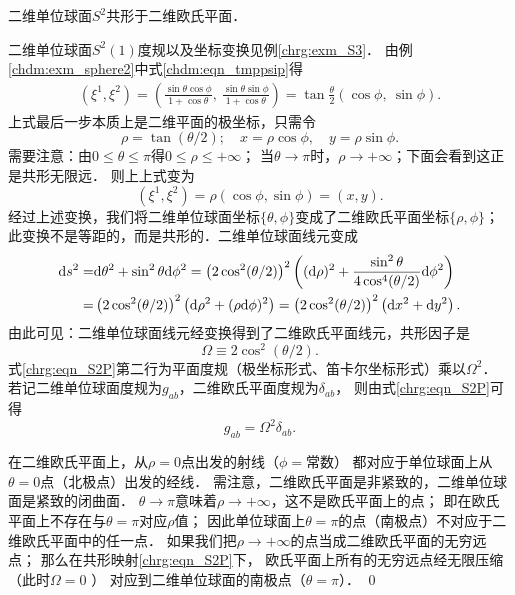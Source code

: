 \begin{example}
	二维单位球面$S^2$共形于二维欧氏平面．
\end{example}
二维单位球面$S^2(1)$度规以及坐标变换见例\ref{chrg:exm_S3}．
由例\ref{chdm:exm_sphere2}中式\eqref{chdm:eqn_tmppsip}得
\begin{align}
	(\xi^1,\xi^2) 
	= \left(\frac{\sin\theta \cos\phi }{1+\cos\theta},\ \frac{\sin\theta \sin\phi}{1+\cos\theta}\right) 
	= \tan \frac{\theta}{2} \left(\cos\phi,\ \sin\phi\right).
\end{align}
上式最后一步本质上是二维平面的极坐标，只需令
\begin{equation}
	\rho=\tan ({\theta}/{2});\quad 
	x = \rho \cos\phi, \quad y = \rho \sin\phi .
\end{equation}
需要注意：由$0 \leqslant \theta \leqslant \pi$得$0\leqslant \rho \leqslant +\infty$；
当$\theta\to \pi$时，$\rho\to +\infty$；下面会看到这正是共形无限远．
则上上式变为
\begin{equation}
	(\xi^1,\xi^2)=\rho\left(\cos\phi,\sin\phi\right) = (x,y).
\end{equation}
经过上述变换，我们将二维单位球面坐标$\{\theta,\phi\}$变成了二维欧氏平面坐标$\{\rho,\phi\}$；
此变换不是等距的，而是共形的．二维单位球面线元变成
\begin{align}
	\mathrm{d} {s}^2 =& \mathrm{d} \theta^2+\sin ^2 \theta \mathrm{d} \phi^2 
	= \left(2 \cos^2(\theta / 2) \right)^2 \left( (\mathrm{d} \rho)^2+ 
	\frac{\sin ^2 \theta }{4 \cos^4(\theta / 2)} \mathrm{d} \phi^2 \right)\notag \\
	=& \left(2 \cos^2(\theta / 2) \right)^2 \left( \mathrm{d} \rho^2+ (\rho \mathrm{d} \phi)^2 \right)
	= \left(2 \cos^2(\theta / 2) \right)^2 \left( \mathrm{d} x^2 + \mathrm{d} y^2 \right).
	\label{chrg:eqn_S2P}
\end{align}
由此可见：二维单位球面线元经变换得到了二维欧氏平面线元，共形因子是
\begin{equation}
	\Omega \equiv 2 \cos ^2(\theta / 2) .
\end{equation}
式\eqref{chrg:eqn_S2P}第二行为平面度规（极坐标形式、笛卡尔坐标形式）乘以$\Omega^2$．
若记二维单位球面度规为$g_{ab}$，二维欧氏平面度规为$\delta_{ab}$，
则由式\eqref{chrg:eqn_S2P}可得
\begin{equation}
	g_{ab} = \Omega^2 \delta_{ab} .
\end{equation}

在二维欧氏平面上，从$\rho=0$点出发的射线（$\phi=$常数）
都对应于单位球面上从$\theta=0$点（北极点）出发的经线．
需注意，二维欧氏平面是非紧致的，二维单位球面是紧致的闭曲面．
$\theta \rightarrow \pi$意味着$\rho \rightarrow +\infty$，这不是欧氏平面上的点；
即在欧氏平面上不存在与$\theta=\pi$对应$\rho$值；
因此单位球面上$\theta=\pi$的点（南极点）不对应于二维欧氏平面中的任一点．
如果我们把$\rho \rightarrow +\infty$的点当成二维欧氏平面的无穷远点；
那么在共形映射\eqref{chrg:eqn_S2P}下，
欧氏平面上所有的无穷远点经无限压缩（此时$\Omega=0$ ）
对应到二维单位球面的南极点（$\theta=\pi$）．
\qed


